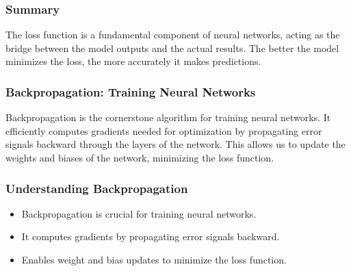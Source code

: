 \documentclass[aspectratio=169]{beamer}
\begin{document}
\begin{frame}[fragile]
    \frametitle{Summary}
    \begin{block}{}
        The loss function is a fundamental component of neural networks, acting as the bridge between the model outputs and the actual results. The better the model minimizes the loss, the more accurately it makes predictions.
    \end{block}
\end{frame}

\begin{frame}[fragile]
    \frametitle{Backpropagation: Training Neural Networks}
    Backpropagation is the cornerstone algorithm for training neural networks. It efficiently computes gradients needed for optimization by propagating error signals backward through the layers of the network. This allows us to update the weights and biases of the network, minimizing the loss function.
\end{frame}

\begin{frame}[fragile]
    \frametitle{Understanding Backpropagation}
    \begin{itemize}
        \item Backpropagation is crucial for training neural networks.
        \item It computes gradients by propagating error signals backward.
        \item Enables weight and bias updates to minimize the loss function.
    \end{itemize}
\end{frame}
\end{document}
